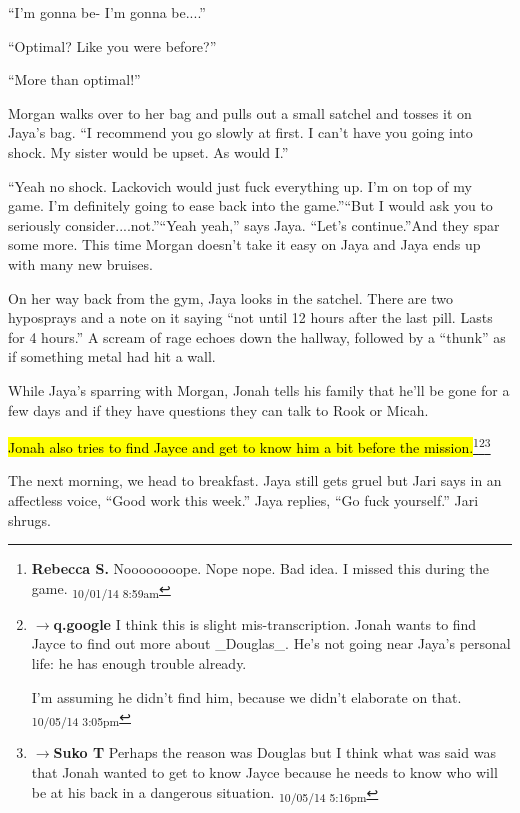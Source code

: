 ``I'm gonna be- I'm gonna be....''

``Optimal?  Like you were before?''

``More than optimal!''

Morgan walks over to her bag and pulls out a small satchel and tosses it on Jaya's bag.  ``I recommend you go slowly at first.  I can't have you going into shock.  My sister would be upset.  As would I.''

``Yeah no shock.  Lackovich would just fuck everything up.  I'm on top of my game.  I'm definitely going to ease back into the game.''``But I would ask you to seriously consider....not.''``Yeah yeah,'' says Jaya.  ``Let's continue.''And they spar some more.  This time Morgan doesn't take it easy on Jaya and Jaya ends up with many new bruises.



On her way back from the gym, Jaya looks in the satchel. There are two hyposprays and a note on it saying ``not until 12 hours after the last pill.  Lasts for 4 hours.''   A scream of rage echoes down the hallway, followed by a ``thunk'' as if something metal had hit a wall.



While Jaya's sparring with Morgan, Jonah tells his family that he'll be gone for a few days and if they have questions they can talk to Rook or Micah.



\hl{Jonah also tries to find Jayce and get to know him a bit before the mission.}\footnote{\textbf{Rebecca S. }Noooooooope. Nope nope. Bad idea.  I missed this during the game. \textsubscript{10/01/14 8:59am}}\footnote{$\rightarrow$\textbf{q.google }I think this is slight mis-transcription.  Jonah wants to find Jayce to find out more about \_Douglas\_.  He's not going near Jaya's personal life: he has enough trouble already.

I'm assuming he didn't find him, because we didn't elaborate on that. \textsubscript{10/05/14 3:05pm}}\footnote{$\rightarrow$\textbf{Suko T }Perhaps the reason was Douglas but I think what was said was that Jonah wanted to get to know Jayce because he needs to know who will be at his back in a dangerous situation. \textsubscript{10/05/14 5:16pm}}





The next morning, we head to breakfast.  Jaya still gets gruel but Jari says in an affectless voice, ``Good work this week.''  Jaya replies, ``Go fuck yourself.''  Jari shrugs.



